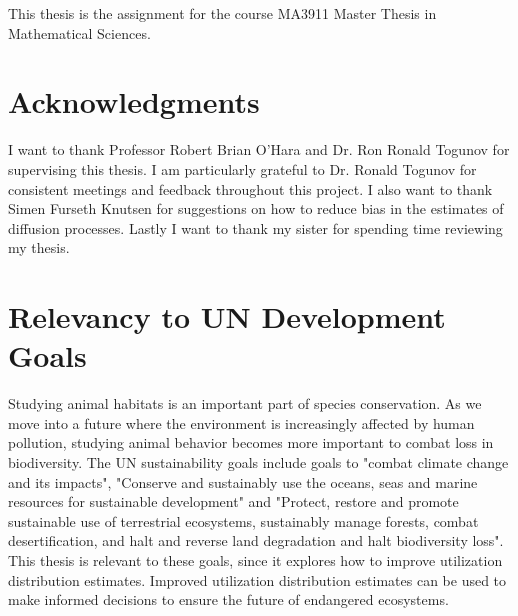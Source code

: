 
This thesis is the assignment for the course MA3911 Master Thesis in Mathematical Sciences.

\section*{Acknowledgments}
I want to thank Professor Robert Brian O'Hara and Dr. Ron Ronald Togunov for supervising this thesis. I am particularly grateful to Dr. Ronald Togunov for consistent meetings and feedback throughout this project. I also want to thank Simen Furseth Knutsen for suggestions on how to reduce bias in the estimates of diffusion processes. Lastly I want to thank my sister for spending time reviewing my thesis.


\section*{Relevancy to UN Development Goals}
Studying animal habitats is an important part of species conservation. As we move into a future where the environment is increasingly affected by human pollution, studying animal behavior becomes more important to combat loss in biodiversity. The UN sustainability goals include goals to "combat climate change and its impacts", "Conserve and sustainably use the oceans, seas and marine resources for sustainable development" and "Protect, restore and promote sustainable use of terrestrial ecosystems, sustainably manage forests, combat desertification, and halt and reverse land degradation and halt biodiversity loss"\parencite{UN_goals}. This thesis is relevant to these goals, since it explores how to improve utilization distribution estimates. Improved utilization distribution estimates can be used to make informed decisions to ensure the future of endangered ecosystems.







\newpage
\null
\thispagestyle{empty}
\newpage